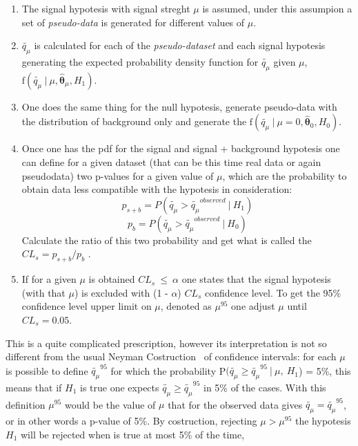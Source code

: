 \begin{enumerate}
	\item The signal hypotesis with signal streght $\mu$ is assumed, under this assumpion a set of 
	\textit{pseudo-data} is generated for different values of $\mu$.

	\item  $\tilde{q_{\mu}}$ is calculated for each of the \textit{pseudo-dataset} and each signal hypotesis generating
	the expected probability density function for $\tilde{q_{\mu}}$ given $\mu$, 
	$\text{f}(\tilde{q_{\mu}} ~| ~ \mu, \hat{\boldsymbol{\theta}}_{\mu},H_1)$.

	\item One does the same thing for the null hypotesis, generate pseudo-data with the distribution of background only and 
	generate  the $\text{f}(\tilde{q_{\mu}} ~ | ~ \mu = 0, \hat{\boldsymbol{\theta}}_{0}, H_0)$.

	\item Once one has the pdf for the signal and signal + background hypotesis one can define for a given dataset (that can be this time
	real data or again pseudodata)  two p-values for a given value of $\mu$, which are the probability to obtain data less compatible with the hypotesis in consideration:
	$$
	p_{s+b} = P(\tilde{q_{\mu}} > \tilde{q_{\mu}}^{observed} ~ | ~ H_1)  
	$$
	$$ 
	p_{b} = P(\tilde{q_{\mu}} > \tilde{q_{\mu}}^{observed} ~ | ~ H_0)
	$$
	Calculate the ratio of this two probability and get what is called the $CL_{s} = p_{s+b} / p_{b}$ \cite{}.

	\item If for a given $\mu$ is obtained $CL_{s} ~ \leq ~ \alpha $ one states that the signal hypotesis (with that $\mu$) 
	is excluded with (1 - $\alpha$) $CL_{s}$ confidence level. To get the 95\% confidence level upper limit on $\mu$,
	denoted as $\mu^{95}$ one adjust $\mu$ until $CL_{s} = 0.05$. 
\end{enumerate}
This is a quite complicated prescription, however 
its interpretation is not so different from the usual Neyman Costruction~\cite{} of confidence intervals:
for each $\mu$ is possible to define $\tilde{q_{\mu}}^{95}$ for which the probability 
P$(\tilde{q_{\mu}} \geq \tilde{q_{\mu}}^{95} ~ |~ \mu, ~ H_1$) = 5\%, this means that if $H_1$ is true one expects 
$\tilde{q_{\mu}} \geq \tilde{q_{\mu}}^{95}$ in 5\% of the cases. With this definition $\mu^{95}$ would be the value of $\mu$
that for the observed data gives $\tilde{q_{\mu}} = \tilde{q_{\mu}}^{95}$, or in other words a p-value of 5\%.
By costruction, rejecting $\mu > \mu^{95}$ the hypotesis $H_1$ will be rejected when is true at most 5\% of the time,
